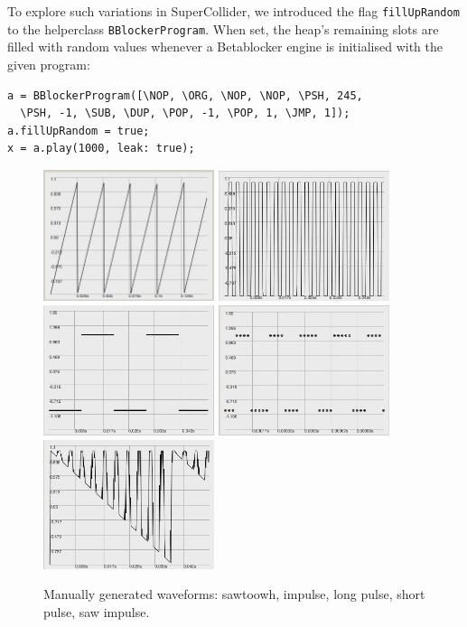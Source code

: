 \documentclass[letterpaper, 12pt]{article}
\begin{document}
To explore such variations in SuperCollider, we introduced the flag \texttt{fillUpRandom} to the helperclass \texttt{BBlockerProgram}.
When set, the heap's remaining slots are filled with random values whenever a Betablocker engine is initialised with the given program:

\begin{Verbatim}[fontfamily=courier, xleftmargin=\parindent]
a = BBlockerProgram([\NOP, \ORG, \NOP, \NOP, \PSH, 245, 
  \PSH, -1, \SUB, \DUP, \POP, -1, \POP, 1, \JMP, 1]);
a.fillUpRandom = true;
x = a.play(1000, leak: true);
\end{Verbatim}

\begin{figure}
	\centering
		\includegraphics[width=5cm]{wv-sawtooth}
		\includegraphics[width=5cm]{wv-impulse}
		\includegraphics[width=5cm]{wv-pulse202}
		\includegraphics[width=5cm]{wv-pulse22}
		\includegraphics[width=5cm]{wv-sawImpulse}
	\caption{Manually generated waveforms: sawtoowh, impulse, long pulse, short pulse, saw impulse.}
	\label{fig:fig_waveforms_POPdestroy-random}
\end{figure}
\parskip 18pt
\end{document}
